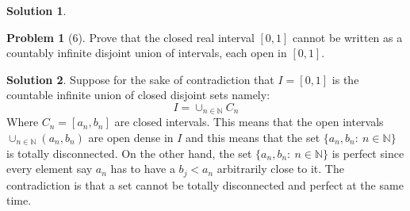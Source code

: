 \documentclass{article}
\theoremstyle{definition}
\newtheorem*{soln}{Solution}
\newtheorem*{prob}{Problem}
\theoremstyle{theorem}
\newcommand{\N}{\mathbb{N}}
\begin{document}
\begin{soln}
\begin{enumerate}
    \end{enumerate}
\end{soln}
\vspace{1in}


\begin{prob}[6]
Prove that the closed real interval $[0, 1]$ cannot be written as a countably infinite disjoint union of intervals, each open in $[0, 1]$. 
\end{prob}
\begin{soln}
    Suppose for the sake of contradiction that $I = [0,1]$ is the countable infinite union of closed disjoint sets namely:
    $$I = \cup_{n\in\N }C_n$$
    Where $C_n = [a_n,b_n]$ are closed intervals. This means that the open intervals $\cup_{n\in \N }(a_n, b_n)$ are open dense in $I$ and this means that the set $\{a_n,b_n :\ n\in \N  \} $ is totally disconnected. On the other hand, the set $\{a_n,b_n :\ n\in \N  \} $ is perfect since every element say $a_n$ has to have a $b_j <a_n$ arbitrarily close to it. The contradiction is that a set cannot be totally disconnected and perfect at the same time.
\end{soln}
\vspace{1in}
\end{document}
